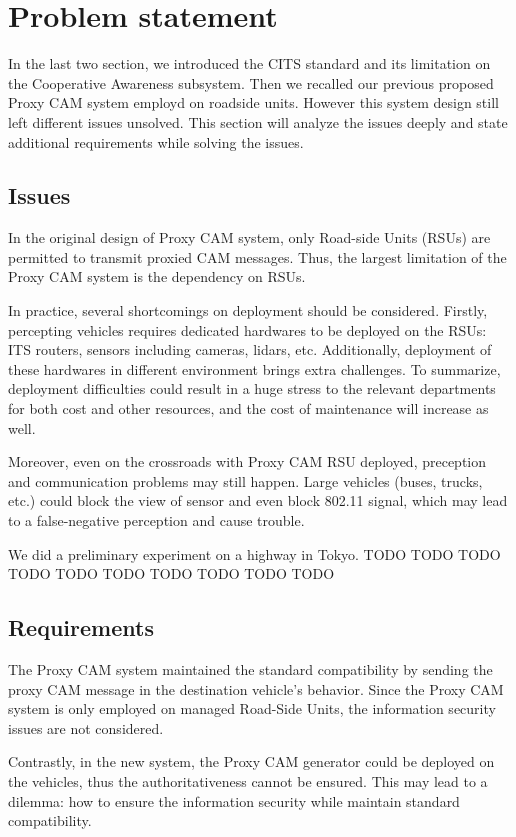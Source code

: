 \section{Problem statement} \label{sec:problem}
In the last two section, we introduced the CITS standard and its limitation on the Cooperative Awareness subsystem.
Then we recalled our previous proposed Proxy CAM system employd on roadside units.
However this system design still left different issues unsolved.
This section will analyze the issues deeply and state additional requirements while solving the issues.

\subsection{Issues}
In the original design of Proxy CAM system, only Road-side Units (RSUs) are permitted to transmit proxied CAM messages.
Thus, the largest limitation of the Proxy CAM system is the dependency on RSUs.

In practice, several shortcomings on deployment should be considered.
Firstly, percepting vehicles requires dedicated hardwares to be deployed on the RSUs: ITS routers, sensors including cameras, lidars, etc.
Additionally, deployment of these hardwares in different environment brings extra challenges.
To summarize, deployment difficulties could result in a huge stress to the relevant departments for both cost and other resources, and the cost of maintenance will increase as well.

Moreover, even on the crossroads with Proxy CAM RSU deployed, preception and communication problems may still happen.
Large vehicles (buses, trucks, etc.) could block the view of sensor and even block 802.11 signal, which may lead to a false-negative perception and cause trouble.

We did a preliminary experiment on a highway in Tokyo.
TODO TODO TODO TODO TODO TODO TODO TODO TODO TODO


\subsection{Requirements}
The Proxy CAM system maintained the standard compatibility by sending the proxy CAM message in the destination vehicle's behavior.
Since the Proxy CAM system is only employed on managed Road-Side Units, the information security issues are not considered.

Contrastly, in the new system, the Proxy CAM generator could be deployed on the vehicles, thus the authoritativeness cannot be ensured.
This may lead to a dilemma: how to ensure the information security while maintain standard compatibility.

